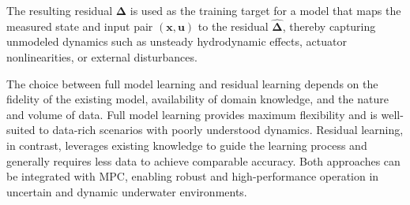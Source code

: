 The resulting residual $\boldsymbol{\Delta}$ is used as the training target for a model that maps the measured state and input pair $(\boldsymbol{x}, \mathbf{u})$ to the residual $\hat{\boldsymbol{\Delta}}$, thereby capturing unmodeled dynamics such as unsteady hydrodynamic effects, actuator nonlinearities, or external disturbances.



The choice between full model learning and residual learning depends on the fidelity of the existing model, availability of domain knowledge, and the nature and volume of data. Full model learning provides maximum flexibility and is well-suited to data-rich scenarios with poorly understood dynamics. Residual learning, in contrast, leverages existing knowledge to guide the learning process and generally requires less data to achieve comparable accuracy. Both approaches can be integrated with MPC, enabling robust and high-performance operation in uncertain and dynamic underwater environments.




